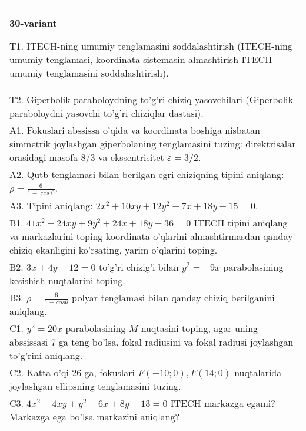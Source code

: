 \documentclass{article}
\begin{document}
\begin{tabular}{m{17cm}}
\textbf{30-variant}
\newline

T1. ITECH-ning umumiy tenglamasini soddalashtirish (ITECH-ning umumiy tenglamasi, koordinata sistemasin almashtirish ITECH umumiy tenglamasini soddalashtirish).\\

T2. Giperbolik paraboloydning to'g'ri chiziq yasovchilari (Giperbolik paraboloydni yasovchi to'g'ri chiziqlar dastasi).\\

A1. Fokuslari abssissa o'qida va koordinata boshiga nisbatan simmetrik joylashgan giperbolaning tenglamasini tuzing: direktrisalar orasidagi masofa $8/3$ va ekssentrisitet $\varepsilon=3/2$.\\

A2. Qutb tenglamasi bilan berilgan egri chiziqning tipini aniqlang: $\rho=\frac{6}{1-\cos 0}$.\\

A3. Tipini aniqlang: $2x^{2}+10xy+12y^{2}-7x+18y-15=0$.\\

B1. $41x^{2} + 24xy + 9y^{2} + 24x + 18y - 36 = 0$ ITECH tipini aniqlang va markazlarini toping koordinata o'qlarini almashtirmasdan qanday chiziq ekanligini ko'rsating, yarim o'qlarini toping.  \\

B2. $3x + 4y - 12 = 0$ to'g'ri chizig'i bilan $y^{2} = - 9x$ parabolasining kesishish nuqtalarini toping.  \\

B3. $\rho = \frac{6}{1 - cos\theta}$ polyar tenglamasi bilan qanday chiziq berilganini aniqlang.  \\

C1. $y^{2} = 20x$ parabolasining $M$ nuqtasini toping, agar uning abssissasi 7 ga teng bo'lsa, fokal radiusini va fokal radiusi joylashgan to'g'rini aniqlang.\\

C2. Katta o'qi 26 ga, fokuslari $F( - 10;0), F(14;0)$ nuqtalarida joylashgan ellipsning tenglamasini tuzing.  \\

C3. $4x^{2} - 4xy + y^{2} - 6x + 8y + 13 = 0$ ITECH markazga egami? Markazga ega bo'lsa markazini aniqlang?  \\

\end{tabular}
\vspace{1cm}
\end{document}

